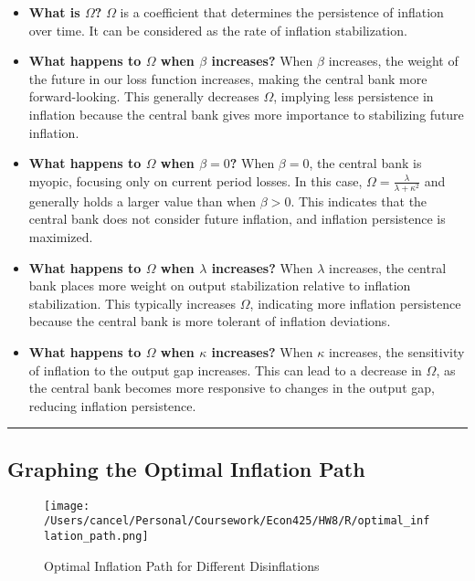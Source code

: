 \documentclass{article}
\begin{document}
\begin{itemize}
        \item \textbf{What is \(\Omega\)?} \(\Omega\) is a coefficient that determines the persistence of inflation over time. It can be considered as the rate of inflation stabilization.
        \item \textbf{What happens to \(\Omega\) when \(\beta\) increases?} When \(\beta\) increases, the weight of the future in our loss function increases, making the central bank more forward-looking. This generally decreases \(\Omega\), implying less persistence in inflation because the central bank gives more importance to stabilizing future inflation.
        \item \textbf{What happens to \(\Omega\) when \(\beta = 0\)?} When \(\beta = 0\), the central bank is myopic, focusing only on current period losses. In this case, \(\Omega = \frac{\lambda}{\lambda+\kappa^2}\) and generally holds a larger value than when \(\beta > 0\). This indicates that the central bank does not consider future inflation, and inflation persistence is maximized.
        \item \textbf{What happens to \(\Omega\) when \(\lambda\) increases?} When \(\lambda\) increases, the central bank places more weight on output stabilization relative to inflation stabilization. This typically increases \(\Omega\), indicating more inflation persistence because the central bank is more tolerant of inflation deviations.
        \item \textbf{What happens to \(\Omega\) when \(\kappa\) increases?} When \(\kappa\) increases, the sensitivity of inflation to the output gap increases. This can lead to a decrease in \(\Omega\), as the central bank becomes more responsive to changes in the output gap, reducing inflation persistence.
\end{itemize}

\noindent\rule{\linewidth}{0.5pt}

\subsection{Graphing the Optimal Inflation Path}

\begin{figure}[ht!]
    \centering
    \texttt{[image: /Users/cancel/Personal/Coursework/Econ425/HW8/R/optimal\_inflation\_path.png]}
    \caption{Optimal Inflation Path for Different Disinflations}
\label{fig:optimal_inflation_path}
\end{figure}
\end{document}
